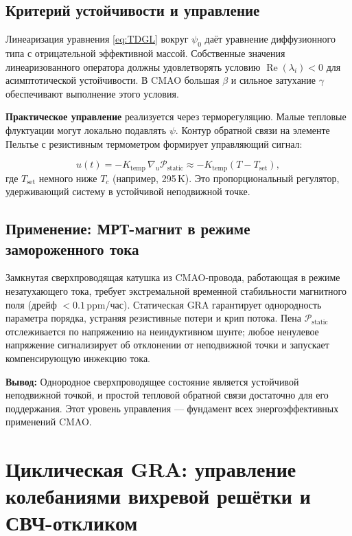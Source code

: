 \documentclass[12pt,a4paper]{article}
\numberwithin{equation}{section}
\begin{document}
\subsection{Критерий устойчивости и управление}

Линеаризация уравнения \eqref{eq:TDGL} вокруг $\psi_0$ даёт уравнение диффузионного типа с отрицательной эффективной массой. Собственные значения линеаризованного оператора должны удовлетворять условию $\operatorname{Re}(\lambda_i) < 0$ для асимптотической устойчивости. В CMAO большая $\beta$ и сильное затухание $\gamma$ обеспечивают выполнение этого условия.

\textbf{Практическое управление} реализуется через терморегуляцию. Малые тепловые флуктуации могут локально подавлять $\psi$. Контур обратной связи на элементе Пельтье с резистивным термометром формирует управляющий сигнал:

\begin{equation}
u(t) = -K_{\text{temp}} \, \nabla_{u} \mathcal{P}_{\text{static}} \approx -K_{\text{temp}} (T - T_{\text{set}}),
\label{eq:static_control}
\end{equation}
где $T_{\text{set}}$ немного ниже $T_c$ (например, 295\,K). Это пропорциональный регулятор, удерживающий систему в устойчивой неподвижной точке.

\subsection{Применение: МРТ-магнит в режиме замороженного тока}

Замкнутая сверхпроводящая катушка из CMAO-провода, работающая в режиме незатухающего тока, требует экстремальной временной стабильности магнитного поля (дрейф $<0.1$\,ppm/час). Статическая GRA гарантирует однородность параметра порядка, устраняя резистивные потери и крип потока. Пена $\mathcal{P}_{\text{static}}$ отслеживается по напряжению на неиндуктивном шунте; любое ненулевое напряжение сигнализирует об отклонении от неподвижной точки и запускает компенсирующую инжекцию тока.

\textbf{Вывод:} Однородное сверхпроводящее состояние является устойчивой неподвижной точкой, и простой тепловой обратной связи достаточно для его поддержания. Этот уровень управления — фундамент всех энергоэффективных применений CMAO.

\section{Циклическая GRA: управление колебаниями вихревой решётки и СВЧ-откликом}
\label{sec:cyclic}
\end{document}
